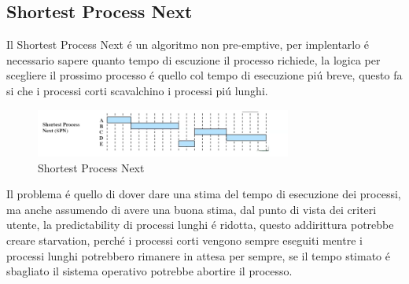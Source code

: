 \documentclass[11pt]{article}
\begin{document}
    \subsection{Shortest Process Next}
    Il Shortest Process Next é un algoritmo non pre-emptive, per implentarlo é necessario sapere quanto tempo di escuzione il
    processo richiede, la logica per scegliere il prossimo processo é quello col tempo di esecuzione piú breve,
    questo fa si che i processi corti scavalchino i processi piú lunghi.
    \begin{figure}[H]
        \centering
        \includegraphics[width=0.75\textwidth]{immagini/SPN}
        \caption{Shortest Process Next}
    \end{figure}
    Il problema é quello di dover dare una stima del tempo di esecuzione dei processi,
    ma anche assumendo di avere una buona stima, dal punto di vista dei criteri utente, la predictability di processi
    lunghi é ridotta, questo addirittura potrebbe creare starvation, perché i processi corti vengono sempre eseguiti
    mentre i processi lunghi potrebbero rimanere in attesa per sempre, se il tempo stimato é sbagliato il sistema operativo
    potrebbe abortire il processo.
\end{document}
